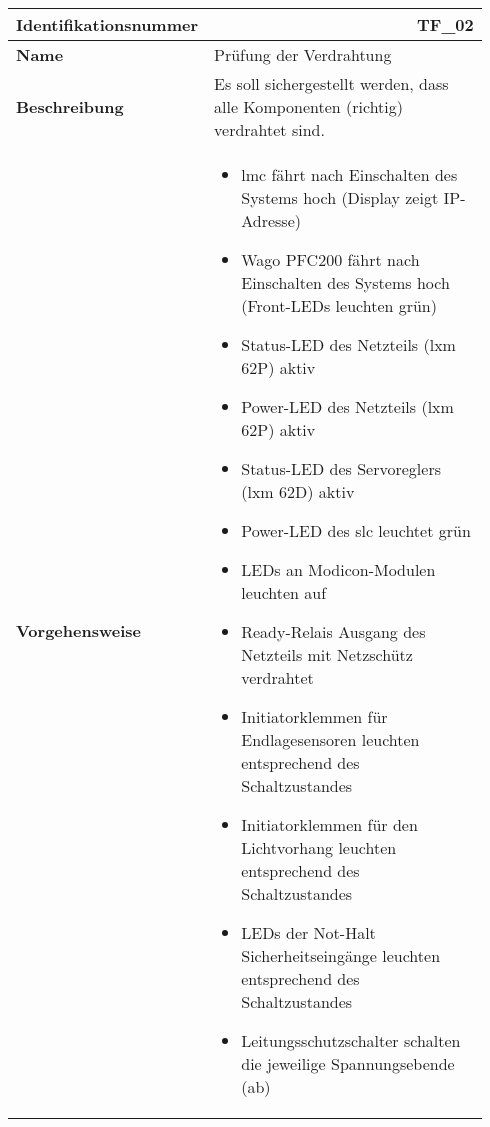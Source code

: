 \documentclass[../../../Bachelorarbeit.tex]{subfiles}
\begin{document}
\begin{table}[H]
    \centering
    \begin{tabular}{ p{0.34\linewidth}  p{0.6\linewidth} }
        \hline
        \textbf{Identifikationsnummer}  & \multicolumn{1}{r}{TF\_02} \\ \hline
        \textbf{Name}                   & Prüfung der Verdrahtung \\
        \textbf{Beschreibung}           & Es soll sichergestellt werden, dass alle Komponenten (richtig) verdrahtet sind. \\
        \textbf{Vorgehensweise}         &   {\begin{itemize}[noitemsep,topsep=0pt,parsep=0pt,partopsep=0pt,leftmargin=*]
                                                \item \acs{lmc} fährt nach Einschalten des Systems hoch (Display zeigt IP-Adresse)
                                                \item Wago PFC200 fährt nach Einschalten des Systems hoch (Front-LEDs leuchten grün)
                                                \item Status-LED des Netzteils (\acs{lxm} 62P) aktiv
                                                \item Power-LED des Netzteils (\acs{lxm} 62P) aktiv
                                                \item Status-LED des Servoreglers (\acs{lxm} 62D) aktiv
                                                \item Power-LED des \acs{slc} leuchtet grün
                                                \item LEDs an Modicon-Modulen leuchten auf
                                                \item Ready-Relais Ausgang des Netzteils mit Netzschütz verdrahtet
                                                \item Initiatorklemmen für Endlagesensoren leuchten entsprechend des Schaltzustandes
                                                \item Initiatorklemmen für den Lichtvorhang leuchten entsprechend des Schaltzustandes
                                                \item LEDs der Not-Halt Sicherheitseingänge leuchten entsprechend des Schaltzustandes
                                                \item Leitungsschutzschalter schalten die jeweilige Spannungsebende (ab)

\end{itemize}}
\end{tabular}
\end{table}
\end{document}
